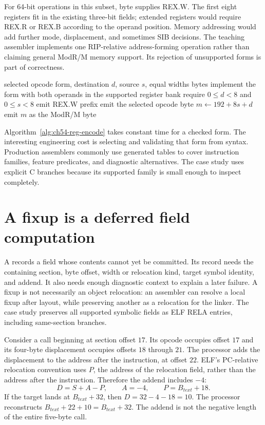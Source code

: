 For 64-bit operations in this subset, byte  supplies REX.W.
The first eight registers fit in the existing three-bit fields; extended registers would require REX.R or REX.B according to the operand position.
Memory addressing would add further mode, displacement, and sometimes SIB decisions.
The teaching assembler implements one RIP-relative address-forming operation rather than claiming general ModR/M memory support.
Its rejection of unsupported forms is part of correctness.

\begin{algorithm}[htbp]
\caption{Encode a checked register-to-register instruction form.}
\label{alg:ch54-reg-encode}
\begin{pseudocode}
\Require selected opcode form, destination $d$, source $s$, equal widths
\Ensure bytes implement the form with both operands in the supported register bank
\State require $0\le d<8$ and $0\le s<8$
  \State emit REX.W prefix
\EndIf
\State emit the selected opcode byte
\State $m\gets 192+8s+d$
\State emit $m$ as the ModR/M byte
\end{pseudocode}
\end{algorithm}

Algorithm~\ref{alg:ch54-reg-encode} takes constant time for a checked form.
The interesting engineering cost is selecting and validating that form from syntax.
Production assemblers commonly use generated tables to cover instruction families, feature predicates, and diagnostic alternatives.
The case study uses explicit C branches because its supported family is small enough to inspect completely.

\section{A fixup is a deferred field computation}
\label{sec:ch54-fixup-record}

A  records a field whose contents cannot yet be committed.
Its record needs the containing section, byte offset, width or relocation kind, target symbol identity, and addend.
It also needs enough diagnostic context to explain a later failure.
A fixup is not necessarily an object relocation: an assembler can resolve a local fixup after layout, while preserving another as a relocation for the linker.
The case study preserves all supported symbolic fields as ELF RELA entries, including same-section branches.

Consider a call beginning at section offset $17$.
Its opcode occupies offset $17$ and its four-byte displacement occupies offsets $18$ through $21$.
The processor adds the displacement to the address after the instruction, at offset $22$.
ELF's PC-relative relocation convention uses $P$, the address of the relocation field, rather than the address after the instruction.
Therefore the addend includes $-4$:
\[
 D=S+A-P,\qquad A=-4,\qquad P=B_{text}+18.
\]
If the target lands at $B_{text}+32$, then $D=32-4-18=10$.
The processor reconstructs $B_{text}+22+10=B_{text}+32$.
The addend is not the negative length of the entire five-byte call.

